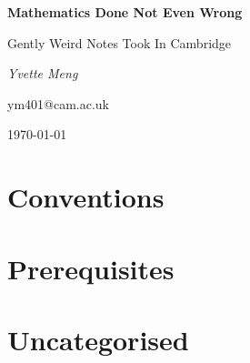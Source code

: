 \documentclass[11pt,a4paper]{article}
\begin{document}
\pagestyle{plain}

\begin{center}                  
\vspace{5cm} 

{\LARGE \textbf{Mathematics Done Not Even Wrong}}\\

\vspace{5cm}

{\large Gently Weird Notes Took In Cambridge}\\

\vspace{5cm}

{\Large \textit{Yvette Meng}}\\

\vspace{1cm}

{\large ym401@cam.ac.uk}\\

\vspace{1cm}

{\large \today}

\end{center}
\newpage

\section{Conventions}

\newpage

\section{Prerequisites}

\newpage

\section{Uncategorised}

\end{document}
